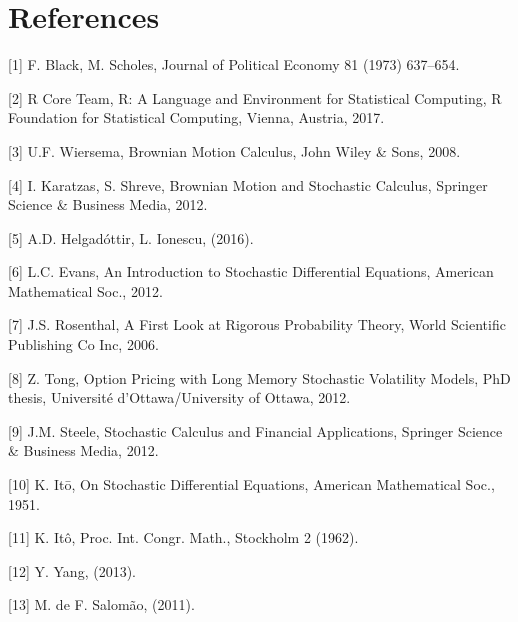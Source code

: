 \documentclass[12pt,twoside]{reedthesis}
\theoremstyle{definition}
\theoremstyle{definition}
\theoremstyle{remark}
\begin{document}
  \backmatter
  
  \chapter*{References}\label{references}
  
  \setlength{\parindent}{-0.0in} \setlength{\leftskip}{0.00in}
  \setlength{\parskip}{6pt}
  
  \hypertarget{refs}{}
  \hypertarget{ref-black1973pricing}{}
  {[}1{]} F. Black, M. Scholes, Journal of Political Economy 81 (1973)
  637--654.
  
  \hypertarget{ref-rlang}{}
  {[}2{]} R Core Team, R: A Language and Environment for Statistical
  Computing, R Foundation for Statistical Computing, Vienna, Austria,
  2017.
  
  \hypertarget{ref-ubbo}{}
  {[}3{]} U.F. Wiersema, Brownian Motion Calculus, John Wiley \& Sons,
  2008.
  
  \hypertarget{ref-karatzas2012brownian}{}
  {[}4{]} I. Karatzas, S. Shreve, Brownian Motion and Stochastic Calculus,
  Springer Science \& Business Media, 2012.
  
  \hypertarget{ref-helgadottir2016option}{}
  {[}5{]} A.D. Helgadóttir, L. Ionescu, (2016).
  
  \hypertarget{ref-evans}{}
  {[}6{]} L.C. Evans, An Introduction to Stochastic Differential
  Equations, American Mathematical Soc., 2012.
  
  \hypertarget{ref-rosenthal}{}
  {[}7{]} J.S. Rosenthal, A First Look at Rigorous Probability Theory,
  World Scientific Publishing Co Inc, 2006.
  
  \hypertarget{ref-tong2012option}{}
  {[}8{]} Z. Tong, Option Pricing with Long Memory Stochastic Volatility
  Models, PhD thesis, Université d'Ottawa/University of Ottawa, 2012.
  
  \hypertarget{ref-steele2012stochastic}{}
  {[}9{]} J.M. Steele, Stochastic Calculus and Financial Applications,
  Springer Science \& Business Media, 2012.
  
  \hypertarget{ref-ito1951}{}
  {[}10{]} K. Itō, On Stochastic Differential Equations, American
  Mathematical Soc., 1951.
  
  \hypertarget{ref-ito1962}{}
  {[}11{]} K. Itô, Proc. Int. Congr. Math., Stockholm 2 (1962).
  
  \hypertarget{ref-yang2013valuing}{}
  {[}12{]} Y. Yang, (2013).
  
  \hypertarget{ref-salomao2011precificaccao}{}
  {[}13{]} M. de F. Salomão, (2011).
  
\end{document}
